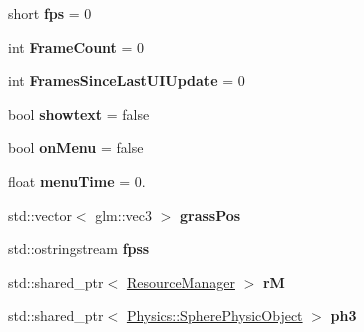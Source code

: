 \begin{DoxyCompactItemize}
\item 
short {\bfseries fps} = 0\hypertarget{class_epsilon_a6eda8c6f3d7757e0ff3f03bc83ae48cc}{}\label{class_epsilon_a6eda8c6f3d7757e0ff3f03bc83ae48cc}

\item 
int {\bfseries Frame\+Count} = 0\hypertarget{class_epsilon_a48b91fd667f11574b7a822dd018251f6}{}\label{class_epsilon_a48b91fd667f11574b7a822dd018251f6}

\item 
int {\bfseries Frames\+Since\+Last\+U\+I\+Update} = 0\hypertarget{class_epsilon_a5fccca83cb7117596c6871424049e3fe}{}\label{class_epsilon_a5fccca83cb7117596c6871424049e3fe}

\item 
bool {\bfseries showtext} = false\hypertarget{class_epsilon_a5c56615886879536842f8511c9c1cd94}{}\label{class_epsilon_a5c56615886879536842f8511c9c1cd94}

\item 
bool {\bfseries on\+Menu} = false\hypertarget{class_epsilon_add6a62776d73af7786cc116b07dc2b22}{}\label{class_epsilon_add6a62776d73af7786cc116b07dc2b22}

\item 
float {\bfseries menu\+Time} = 0.\hypertarget{class_epsilon_a2bc93af33dc0013fa82dfe19d62effff}{}\label{class_epsilon_a2bc93af33dc0013fa82dfe19d62effff}

\item 
std\+::vector$<$ glm\+::vec3 $>$ {\bfseries grass\+Pos}\hypertarget{class_epsilon_ac96f8c02f0e5a73154e7036c7fb79450}{}\label{class_epsilon_ac96f8c02f0e5a73154e7036c7fb79450}

\item 
std\+::ostringstream {\bfseries fpss}\hypertarget{class_epsilon_a8f6ec2cc773f0a8a20b9293a1d59d8d9}{}\label{class_epsilon_a8f6ec2cc773f0a8a20b9293a1d59d8d9}

\item 
std\+::shared\+\_\+ptr$<$ \hyperlink{class_resource_manager}{Resource\+Manager} $>$ {\bfseries rM}\hypertarget{class_epsilon_aed713f9eef6e236d05ed4b2a36aab155}{}\label{class_epsilon_aed713f9eef6e236d05ed4b2a36aab155}

\item 
std\+::shared\+\_\+ptr$<$ \hyperlink{class_physics_1_1_sphere_physic_object}{Physics\+::\+Sphere\+Physic\+Object} $>$ {\bfseries ph3}\hypertarget{class_epsilon_a923fb68faf4526bf2bfdb7762ab2d566}{}\label{class_epsilon_a923fb68faf4526bf2bfdb7762ab2d566}


\end{DoxyCompactItemize}
